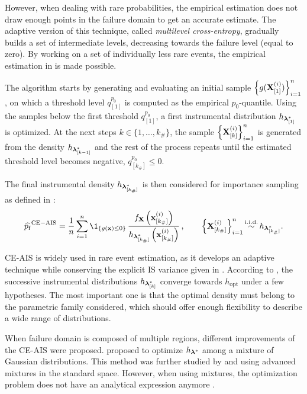 However, when dealing with rare probabilities, the empirical estimation does not draw enough points in the failure domain to get an accurate estimate. 
The adaptive version of this technique, called \textit{multilevel cross-entropy}, gradually builds a set of intermediate levels, decreasing towards the failure level (equal to zero). 
By working on a set of individually less rare events, the empirical estimation in  is made possible. 

The algorithm starts by generating and evaluating an initial sample $\left\{g({\bf X}_{[1]}^{(i)})\right\}_{i=1}^n$, on which a threshold level $q_{[1]}^{p_0}$ is computed as the empirical $p_0$-quantile. 
Using the samples below the first threshold $q_{[1]}^{p_0}$, a first instrumental distribution $h_{{\boldsymbol{\lambda}}^*_{[1]}}$ is optimized.  
At the next steps $k\in \{1, \dots, k_\# \}$, the sample $\left\{{\bf X}_{[k]}^{(i)}\right\}_{i=1}^n$ is generated from the density $h_{{\boldsymbol{\lambda}}^*_{[k-1]}}$ and the rest of the process repeats until the estimated threshold level becomes negative, $q_{[k_\#]}^{p_0} \leq 0$. 

The final instrumental density $h_{{\boldsymbol{\lambda}}^*_{[k_{\#}]}}$ is then considered for importance sampling as defined in : 
\begin{equation}
    \what{\pf}^{\mathrm{CE-AIS}} = \frac1n \sum_{i=1}^{n} \1_{\{g(\bx) \leq 0\}} \,
                                                 \frac{f_\bX\left(\bx^{(i)}_{[k_{\#}]}\right)}{ h_{\blambda^*_{[k_{\#}]}}\left(\bx^{(i)}_{[k_{\#}]}\right)} \, , \qquad
                                                 \left\{\bX_{[k_{\#}]}^{(i)}\right\}_{i=1}^n \simiid h_{\blambda^*_{[k_{\#}]}}.
\end{equation}

CE-AIS is widely used in rare event estimation, as it develops an adaptive technique while conserving the explicit IS variance given in .  
According to \citet{rubinstein_2004_CE}, the successive instrumental distributions $h_{{\boldsymbol{\lambda}}^*_{[k]}}$ converge towards $h_{\mathrm{opt}}$ under a few hypotheses. 
The most important one is that the optimal density must belong to the parametric family considered, which should offer enough flexibility to describe a wide range of distributions. 

When failure domain is composed of multiple regions, different improvements of the CE-AIS were proposed. 
\citet{kurtz_song_2013_aisce} proposed to optimize $h_{{\boldsymbol{\lambda}}^*}$ among a mixture of Gaussian distributions. 
This method was further studied by \citet{wang_2016_aisce} and \citet{papaioannou_2019_aisce} using advanced mixtures in the standard space.
However, when using mixtures, the optimization problem does not have an analytical expression anymore \citep{geyer_2019_aisce}.   

